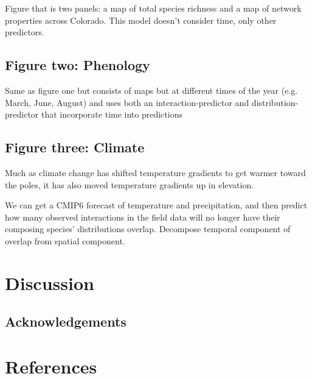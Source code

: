 \documentclass[11pt]{article}
\begin{document}
Figure that is two panels: a map of total species richness and a map of
network properties across Colorado. This model doesn't consider time,
only other predictors.

\hypertarget{figure-two-phenology}{%
\subsection{Figure two: Phenology}\label{figure-two-phenology}}

Same as figure one but consists of maps but at different times of the
year (e.g. March, June, August) and uses both an interaction-predictor
and distribution-predictor that incorporate time into predictions

\hypertarget{figure-three-climate}{%
\subsection{Figure three: Climate}\label{figure-three-climate}}

Much as climate change has shifted temperature gradients to get warmer
toward the poles, it has also moved temperature gradients up in
elevation.

We can get a CMIP6 forecast of temperature and precipitation, and then
predict how many observed interactions in the field data will no longer
have their composing species' distributions overlap. Decompose temporal
component of overlap from spatial component.

\hypertarget{discussion}{%
\section{Discussion}\label{discussion}}

\hypertarget{acknowledgements}{%
\subsection{Acknowledgements}\label{acknowledgements}}

\hypertarget{references}{%
\section*{References}\label{references}}
\end{document}
